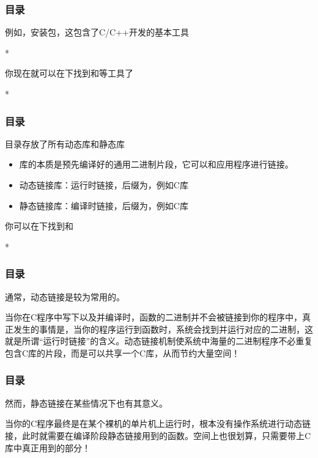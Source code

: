 \begin{frame}
    \frametitle{目录}
    例如，安装包，这包含了C/C++开发的基本工具
    \begin{Code}*
        
    \end{Code}
    你现在就可以在下找到和等工具了
    \begin{Code}*
        
    \end{Code}
\end{frame}

\begin{frame}
    \frametitle{目录}
    目录存放了所有动态库和静态库 
    \begin{itemize}
        \item 库的本质是预先编译好的通用二进制片段，它可以和应用程序进行链接。
        \item 动态链接库：运行时链接，后缀为，例如C库
        \item 静态链接库：编译时链接，后缀为，例如C库
    \end{itemize}
    你可以在下找到和
    \begin{Code}*
        
    \end{Code}
\end{frame}

\begin{frame}
    \frametitle{目录}
    通常，动态链接是较为常用的。
    
    当你在C程序中写下以及并编译时，函数的二进制并不会被链接到你的程序中，真正发生的事情是，当你的程序运行到函数时，系统会找到并运行对应的二进制，这就是所谓“运行时链接”的含义。动态链接机制使系统中海量的二进制程序不必重复包含C库的片段，而是可以共享一个C库，从而节约大量空间！

\end{frame}

\begin{frame}
    \frametitle{目录}
    
    然而，静态链接在某些情况下也有其意义。
    
    当你的C程序最终是在某个裸机的单片机上运行时，根本没有操作系统进行动态链接，此时就需要在编译阶段静态链接用到的函数。空间上也很划算，只需要带上C库中真正用到的部分！
\end{frame}

